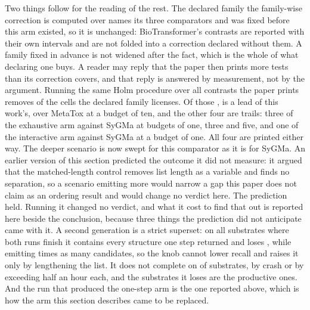 \documentclass[journal=jcisd8,manuscript=suppinfo,layout=onecolumn]{achemso}
\begin{document}
Two things follow for the reading of the rest. The declared family the family-wise correction is
computed over names its three comparators and was fixed before this arm existed, so it is
unchanged: BioTransformer's contrasts are reported with their own intervals and are not folded
into a correction declared without them. A family fixed in advance is not widened after the fact,
which is the whole of what declaring one buys. A reader may reply that the paper then prints more
tests than its correction covers, and that reply is answered by measurement, not by the argument.
Running the same Holm procedure over all \numHolmWidetests{} contrasts the paper prints removes
\numHolmWideremovesWord{} of the cells the declared family licenses. Of those \numHolmWideremovesWord{},
\numHolmWideleadsremovedWord{} is a lead of this work's, over MetaTox at a budget of ten, and the other
four are trails: three of the exhaustive arm against SyGMa at budgets of one, three and five, and
one of the interactive arm against SyGMa at a budget of one. All four are printed either way. The deeper scenario is now swept for this comparator as it is for SyGMa. An earlier version of
this section predicted the outcome it did not measure: it argued that the matched-length
control removes list length as a variable and finds no separation, so a scenario emitting more
would narrow a gap this paper does not claim as an ordering result and would change no verdict
here. The prediction held. Running it changed no verdict, and what it cost to find that out is
reported here beside the conclusion, because three things the prediction did not
anticipate came with it. A second generation is a strict superset: on all \numBtstepsPaired{}
substrates where both runs finish it contains every structure one step returned and loses
\numBtstepsLostgenoneWord{}, while emitting \numBtstepsRatio{} times as many candidates, so the knob
cannot lower recall and raises it only by lengthening the list. It does not complete on
\numBtstepsLost{} of \numBtstepsAttempted{} substrates, by crash or by exceeding half an hour
each, and the substrates it loses are the productive ones. And the run that produced the one-step
arm is the one reported above, which is how the arm this section describes came to be replaced.
\end{document}
